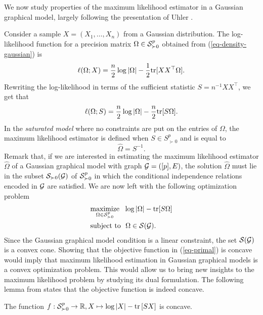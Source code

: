 We now study properties of the maximum likelihood estimator in a Gaussian graphical model, largely following the presentation of Uhler \cite[Section 9]{maathuis2018handbook}.

Consider a sample $X = (X_1, \ldots, X_n)$ from a Gaussian distribution. The log-likelihood function for a precision matrix $\Omega \in \S^p_{\succ 0}$ obtained from (\ref{eq-density-gaussian}) is
\begin{equation*}
    \ell(\Omega; X) = \frac{n}{2} \log |\Omega| - \frac{1}{2}\tr[XX^\top\Omega].
\end{equation*}
Rewriting the log-likelihood in terms of the sufficient statistic $S = n^{-1}XX^\top$, we get that
\begin{equation} \label{eq-likelihood}
    \ell(\Omega; S) = \frac{n}{2}\log |\Omega| - \frac{n}{2}\tr[S\Omega].
\end{equation}
In the \textit{saturated model} where no constraints are put on the entries of $\Omega$, the maximum likelihood estimator is defined when $S \in S^p_{\succ 0}$ and is equal to
\begin{equation*}
    \hat\Omega = S^{-1}.
\end{equation*}
Remark that, if we are interested in estimating the maximum likelihood estimator $\hat\Omega$ of a Gaussian graphical model with graph $\G = ([p], E)$, the solution $\hat\Omega$ must lie in the subset $\S_{\succ 0}(\G)$ of $\S^p_{\succ 0}$ in which the conditional independence relations encoded in $\G$ are satisfied. We are now left with the following optimization problem
\begin{align} \label{eq-primal}
    \begin{split}
        &\underset{\Omega \in \S^p_{\succ 0}}{\t{maximize}}\ \  \log |\Omega| - \tr[S\Omega]\\
        &\t{subject to}\ \ \Omega \in \S(\G).
    \end{split}
\end{align}
Since the Gaussian graphical model condition is a linear constraint, the set $\S(\G)$ is a convex cone. Showing that the objective function in (\ref{eq-primal}) is concave would imply that maximum likelihood estimation in Gaussian graphical models is a convex optimization problem. This would allow us to bring new insights to the maximum likelihood problem by studying its dual formulation. The following lemma from \cite[Proposition 9.2.1]{maathuis2018handbook} states that the objective function is indeed concave.
\begin{lemma}
    The function $f : \S^p_{\succ 0} \rightarrow \R, X \mapsto \log |X| - \trB{SX}$ is concave.
\end{lemma}
